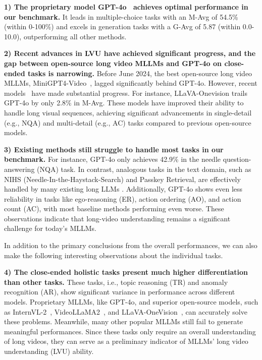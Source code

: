 \textbf{1) The proprietary model GPT-4o~\cite{gpt4o} achieves optimal performance in our benchmark.} It leads in multiple-choice tasks with an M-Avg of 54.5\%(within 0-100\%) and excels in generation tasks with a G-Avg of 5.87 (within 0.0-10.0), outperforming all other methods.

\textbf{{2) Recent advances in LVU have achieved significant progress, and the gap between open-source long video MLLMs and GPT-4o on close-ended tasks is narrowing.}} Before June 2024, the best open-source long video MLLMs, MiniGPT4-Video~\cite{minigpt4video-2024}, lagged significantly behind GPT-4o. However, recent models~\cite{zhang2024longva, fei2024videoccam, shu2024videoxl, li2024llavaonevision} have made substantial progress. For instance, LLaVA-Onevision trails GPT-4o by only 2.8\% in M-Avg. These models have improved their ability to handle long visual sequences, achieving significant advancements in single-detail (e.g., NQA) and multi-detail (e.g., AC) tasks compared to previous open-source models.

\textbf{{3) Existing methods still struggle to handle most tasks in our benchmark.}} For instance, GPT-4o only achieves 42.9\% in the needle question-answering (NQA) task. In contrast, analogous tasks in the text domain, such as NIHS (Needle-In-the-Haystack-Search) and Passkey Retrieval, are effectively handled by many existing long LLMs \cite{fu2024data,inftybench-2024}. Additionally, GPT-4o shows even less reliability in tasks like ego-reasoning (ER), action ordering (AO), and action count (AC), with most baseline methods performing even worse. %
These observations indicate that long-video understanding remains a significant challenge for today's MLLMs.

In addition to the primary conclusions from the overall performances, we can also make the following interesting observations about the individual tasks.

\textbf{{4) The close-ended holistic tasks present much higher differentiation than other tasks.}} These tasks, i.e., topic reasoning (TR) and anomaly recognition (AR), show significant variance in performance across different models. Proprietary MLLMs, like GPT-4o, and superior open-source models, such as InternVL-2~\cite{internvl-1.5-2024}, VideoLLaMA2~\cite{cheng2024videollama2}, and LLaVA-OneVision~\cite{li2024llavaonevision}, can accurately solve these problems. Meanwhile, many other popular MLLMs still fail to generate meaningful performances. Since these tasks only require an overall understanding of long videos, they can serve as a preliminary indicator of MLLMs' long video understanding (LVU) ability.

